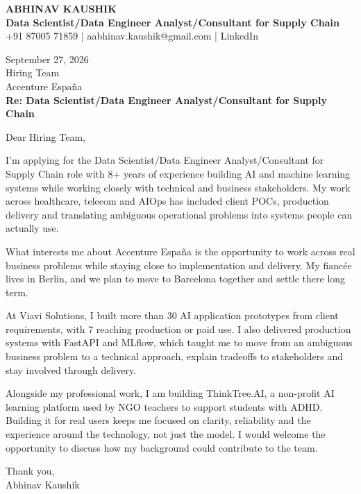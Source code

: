 \documentclass[10pt,a4paper]{article}
\begin{document}
\begin{center}
{\Large\bfseries ABHINAV KAUSHIK}\\[2pt]
{\bfseries Data Scientist/Data Engineer Analyst/Consultant for Supply Chain}\\[2pt]
+91 87005 71859 \quad | \quad aabhinav.kaushik@gmail.com \quad | \quad LinkedIn
\end{center}
\vspace{8pt}
September 27, 2026\\[6pt]
Hiring Team\\
Accenture España\\[4pt]
\textbf{Re: Data Scientist/Data Engineer Analyst/Consultant for Supply Chain}

Dear Hiring Team,

I’m applying for the Data Scientist/Data Engineer Analyst/Consultant for Supply Chain role with 8+ years of experience building AI and machine learning systems while working closely with technical and business stakeholders. My work across healthcare, telecom and AIOps has included client POCs, production delivery and translating ambiguous operational problems into systems people can actually use.

What interests me about Accenture España is the opportunity to work across real business problems while staying close to implementation and delivery. My fiancée lives in Berlin, and we plan to move to Barcelona together and settle there long term.

At Viavi Solutions, I built more than 30 AI application prototypes from client requirements, with 7 reaching production or paid use. I also delivered production systems with FastAPI and MLflow, which taught me to move from an ambiguous business problem to a technical approach, explain tradeoffs to stakeholders and stay involved through delivery.

Alongside my professional work, I am building ThinkTree.AI, a non-profit AI learning platform used by NGO teachers to support students with ADHD. Building it for real users keeps me focused on clarity, reliability and the experience around the technology, not just the model. I would welcome the opportunity to discuss how my background could contribute to the team.

Thank you,\\
Abhinav Kaushik
\end{document}
